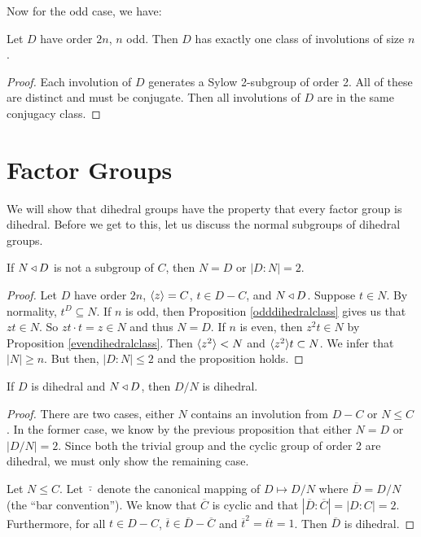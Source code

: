 \documentclass[main.tex]{subfiles}
\begin{document}
Now for the odd case, we have:

\begin{proposition}\label{odddihedralclass}
Let $D$ have order $2n$, $n$ odd. Then $D$ has exactly one class of involutions of size $n$.
\end{proposition}

\begin{proof}
Each involution of $D$ generates a Sylow 2-subgroup of order 2. All of these are distinct and must be conjugate. Then all involutions of $D$ are in the same conjugacy class.
\end{proof}

\hss

\section{Factor Groups}

\hss

We will show that dihedral groups have the property that every factor group is dihedral. Before we get to this, let us discuss the normal subgroups of dihedral groups.

\begin{proposition}
If $N \triangleleft D$ is not a subgroup of $C$, then $N = D$ or $|D : N| = 2$.
\end{proposition}

\begin{proof}
Let $D$ have order $2n$, $\langle z \rangle = C$, $t \in D - C$, and $N \triangleleft D$. Suppose $t \in N$. By normality, $t^D \subseteq N$. If $n$ is odd, then Proposition \ref{odddihedralclass} gives us that $z t \in N$. So $z t \cdot t = z \in N$ and thus $N = D$. If $n$ is even, then $z^2 t \in N$ by Proposition \ref{evendihedralclass}. Then $\langle z^2 \rangle < N$ and $\langle z^2 \rangle t \subset N$. We infer that $|N| \ge n$. But then, $|D : N| \le 2$ and the proposition holds.
\end{proof}

\begin{proposition}
If $D$ is dihedral and $N \triangleleft D$, then $D/N$ is dihedral.
\end{proposition}

\begin{proof}
There are two cases, either $N$ contains an involution from $D - C$  or $N \le C$. In the former case, we know by the previous proposition that either $N = D$ or $|D/N| = 2$. Since both the trivial group and the cyclic group of order 2 are dihedral, we must only show the remaining case.

Let $N \le C$. Let $\bar{ \cdot }$ denote the canonical mapping of $D \mapsto D/N$ where $\overline{D} = D/N$ (the ``bar convention''). We know that $\overline{C}$ is cyclic and that $|\overline{D} : \overline{C}| = |D : C| = 2$. Furthermore, for all $t \in D - C$, $\overline{t} \in \overline{D} - \overline{C}$ and $\overline{t}^2 = \overline{tt} = 1$. Then $\overline{D}$ is dihedral.

\end{proof}
\end{document}
